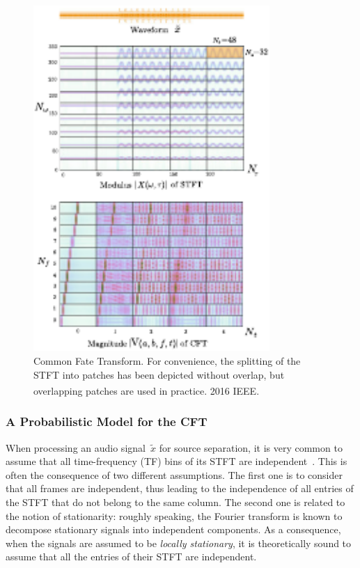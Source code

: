 \begin{figure}[t]
\centering
\includegraphics[width=0.8\textwidth]{Chapters/06_Separation_Unknown/figures/CFT}
\caption{Common Fate Transform. For convenience, the splitting of the STFT
into patches has been depicted without overlap, but overlapping patches are used in practice\label{fig:CFT}. \textsuperscript{\textregistered}2016 IEEE.}
\end{figure}

\subsubsection{A Probabilistic Model for the CFT}

\label{ssub:separation}

When processing an audio signal~$\tilde{x}$ for source separation,
it is very common to assume that all time-frequency (TF) bins
of its STFT are independent~\cite{fevotte09, duong10, ozerov12, liutkus11t}.
This is often the consequence of two different assumptions.
The first one is to consider that all frames are independent, thus
leading to the independence of all entries of the STFT that do not belong to the
same column. The second one is related to the notion of stationarity:
roughly speaking, the Fourier transform is known to decompose stationary
signals into independent components.
As a consequence, when the signals are assumed to be \emph{locally stationary},
it is theoretically sound to assume that all the entries of
their STFT are independent.

